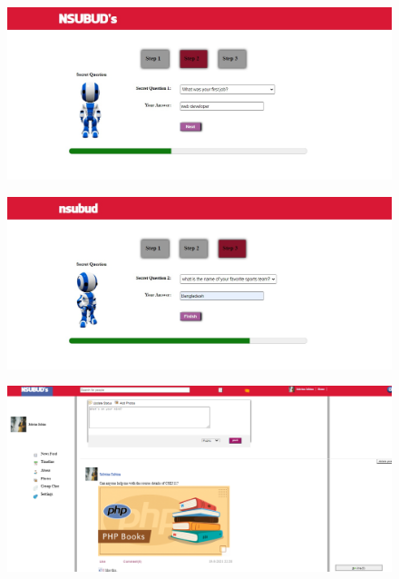{{\begin{figure}[ht]
\label{fig:graph}
\end{figure}
\begin{figure}[ht]
\includegraphics[width=18cm]{images/signup2.png}
\label{fig:graph}
\end{figure}
\newpage
\begin{figure}[ht]
\includegraphics[width=18cm]{images/signup3.png}
\label{fig:graph}
\end{figure}
\begin{figure}[ht]
\includegraphics[width=18cm]{figures/screen2.png}
\label{fig:graph}
\end{figure}
\newpage
\begin{figure}[ht]

\end{figure}}}
